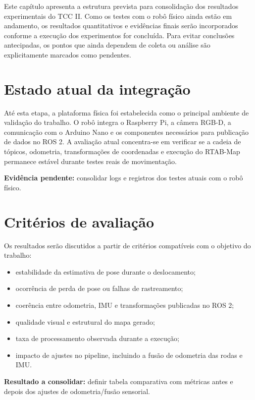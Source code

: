 Este capítulo apresenta a estrutura prevista para consolidação dos resultados experimentais do TCC II. Como os testes com o robô físico ainda estão em andamento, os resultados quantitativos e evidências finais serão incorporados conforme a execução dos experimentos for concluída. Para evitar conclusões antecipadas, os pontos que ainda dependem de coleta ou análise são explicitamente marcados como pendentes.

\section{Estado atual da integração}

Até esta etapa, a plataforma física foi estabelecida como o principal ambiente de validação do trabalho. O robô integra o Raspberry Pi, a câmera RGB-D, a comunicação com o Arduino Nano e os componentes necessários para publicação de dados no ROS 2. A avaliação atual concentra-se em verificar se a cadeia de tópicos, odometria, transformações de coordenadas e execução do RTAB-Map permanece estável durante testes reais de movimentação.

\noindent\textbf{Evidência pendente:} consolidar logs e registros dos testes atuais com o robô físico.

\section{Critérios de avaliação}

Os resultados serão discutidos a partir de critérios compatíveis com o objetivo do trabalho:

\begin{itemize}
    \item estabilidade da estimativa de pose durante o deslocamento;
    \item ocorrência de perda de pose ou falhas de rastreamento;
    \item coerência entre odometria, IMU e transformações publicadas no ROS 2;
    \item qualidade visual e estrutural do mapa gerado;
    \item taxa de processamento observada durante a execução;
    \item impacto de ajustes no pipeline, incluindo a fusão de odometria das rodas e IMU.
\end{itemize}

\noindent\textbf{Resultado a consolidar:} definir tabela comparativa com métricas antes e depois dos ajustes de odometria/fusão sensorial.

